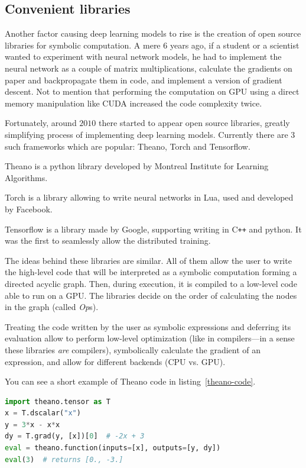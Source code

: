 \subsection{Convenient libraries}
Another factor causing deep learning models to rise is the creation of open source libraries for symbolic computation. A mere $6$ years ago, if a student or a scientist wanted to experiment with neural network models, he had to implement the neural network as a couple of matrix multiplications, calculate the gradients on paper and backpropagate them in code, and implement a version of gradient descent. Not to mention that performing the computation on GPU using a direct memory manipulation like CUDA increased the code complexity twice.

Fortunately, around $2010$ there started to appear open source libraries, greatly simplifying process of implementing deep learning models. Currently there are $3$ such frameworks which are popular: Theano, Torch and Tensorflow.

Theano \cite{theano} is a python library developed by Montreal Institute for Learning Algorithms.

Torch \cite{torch} is a library allowing to write neural networks in Lua, used and developed by Facebook.

Tensorflow \cite{tensorflow} is a library made by Google, supporting writing in C\texttt{++} and python. It was the first to seamlessly allow the distributed training.

The ideas behind these libraries are similar. All of them allow the user to write the high-level code that will be interpreted as a symbolic computation forming a directed acyclic graph. Then, during execution, it is compiled to a low-level code able to run on a GPU. The libraries decide on the order of calculating the nodes in the graph (called \emph{Op}s).

Treating the code written by the user as symbolic expressions and deferring its evaluation allow to perform low-level optimization (like in compilers---in a sense these libraries \textit{are} compilers), symbolically calculate the gradient of an expression, and allow for different backends (CPU vs. GPU).

You can see a short example of Theano code in listing~\ref{theano-code}.

\begin{lstlisting}[language=Python, caption=Example Theano code.,label={theano-code}
]
import theano.tensor as T
x = T.dscalar("x")
y = 3*x - x*x
dy = T.grad(y, [x])[0]  # -2x + 3
eval = theano.function(inputs=[x], outputs=[y, dy])
eval(3)  # returns [0., -3.]
\end{lstlisting}

